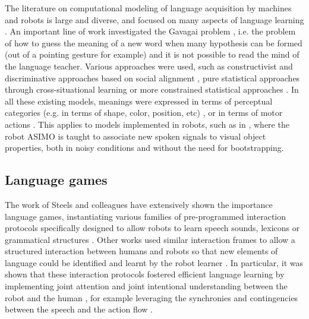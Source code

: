 The literature on computational modeling of language acquisition by machines and robots is large and diverse, and focused on many aspects of language learning \cite{steels2012grounding,steels2002aibos, cangelosi2010integration, kaplan2008computational, steels2003evolving, brent1997computational, yu2007unified}. An important line of work investigated the Gavagai problem \cite{quine1964word}, i.e. the problem of how to guess the meaning of a new word when many hypothesis can be formed (out of a pointing gesture for example) and it is not possible to read the mind of the language teacher. Various approaches were used, such as constructivist and discriminative approaches based on social alignment \cite{steels06spatialLanguage, steels2008can}, pure statistical approaches through cross-situational learning \cite{xu2007word, smith2008infants} or more constrained statistical approaches \cite{roy2005semiotic, yu2007unified}. In all these existing models, meanings were expressed in terms of perceptual categories (e.g. in terms of shape, color, position, etc) \cite{steels06spatialLanguage, steels2008can,yu2007unified}, or in terms of motor actions \cite{steels2008robot, Massera2010,sugita05a}. This applies to models implemented in robots, such as in \cite{heckmann2009teaching}, where the robot ASIMO is taught to associate new spoken signals to visual object properties, both in noisy conditions and without the need for bootstrapping. 



\subsection{Language games}

The work of Steels and colleagues \cite{steels2012grounding,steels2002aibos} have extensively shown the importance language games, instantiating various families of pre-programmed interaction protocols specifically designed to allow robots to learn speech sounds\cite{de2000self,oudeyer2006self}, lexicons \cite{steels2002aibos} or grammatical structures \cite{steels06spatialLanguage, steels2008can}. Other works used similar interaction frames to allow a structured interaction between humans and robots so that new elements of language could be identified and learnt by the robot learner \cite{roy02a,lyon2012interactive,cangelosi06b,yu2004multimodal,cangelosi2010integration,sugita05a,dominey2005learning,cederborg2011imitating}. In particular, it was shown that these interaction protocols fostered efficient language learning by implementing joint attention and joint intentional understanding between the robot and the human \cite{kaplan2006challenges,yu2005role,yu2007unified}, for example leveraging the synchronies and contingencies between the speech and the action flow \cite{rohlfing2006can,schillingmann2011acoustic}. 

